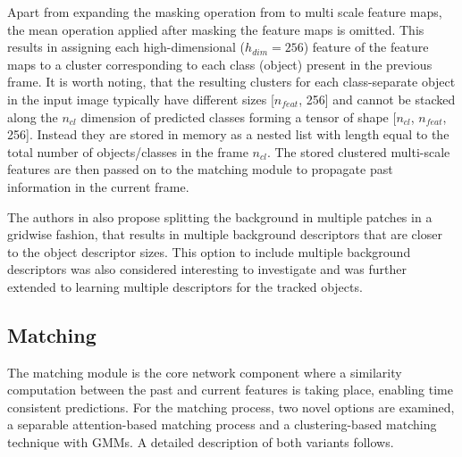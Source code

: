 Apart from expanding the masking operation from \parencite{athar2022hodor} to multi scale feature maps,  the mean operation applied after masking the feature maps is omitted. This results in assigning each high-dimensional ($h_{dim}= 256$) feature of the feature maps to a cluster corresponding to each class (object) present in the previous frame. It is worth noting, that the resulting clusters for each class-separate object in the input image typically have different sizes [$n_{feat}$, 256] and cannot be stacked along the $n_{cl}$ dimension of predicted classes forming a tensor of shape [$n_{cl}$, $n_{feat}$, 256]. Instead they are stored in memory as a nested list with length equal to the total number of objects/classes in the frame $n_{cl}$. The stored clustered multi-scale features are then passed on to the matching module to propagate past information in the current frame. \par


The authors in \parencite{athar2022hodor} also propose splitting the background in multiple patches in a gridwise fashion, that results in multiple background descriptors that are closer to the object descriptor sizes. This option to include multiple background descriptors was also considered interesting to investigate and was further extended to learning multiple descriptors for the tracked objects. \par
 


\vspace{5mm}


\subsection{Matching}
The matching module is the core network component where a similarity computation between the past and current features is taking place, enabling time consistent predictions. For the matching process, two novel options are examined, a separable attention-based matching process and a clustering-based matching technique with \gls{GMM}s. A detailed description of both variants follows. 

